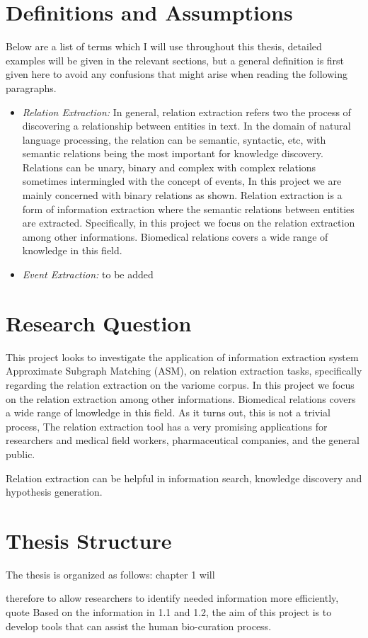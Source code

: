 \section{Definitions and Assumptions}
Below are a list of terms which I will use throughout this thesis, detailed examples will be given in the relevant sections, but a general definition is first given here to avoid any confusions that might arise when reading the following paragraphs.
\begin{itemize}
	\item \emph{Relation Extraction:} In general, relation extraction refers two the process of discovering a relationship between entities in text. In the domain of natural language processing, the relation can be semantic, syntactic, etc, with semantic relations being the most important for knowledge discovery. Relations can be unary, binary and complex with complex relations sometimes intermingled with the concept of events, In this project we are mainly concerned with binary relations as shown. Relation extraction is a form of information extraction where the semantic relations between entities are extracted.
	Specifically, in this project we focus on the relation extraction among other informations. Biomedical relations covers a wide range of knowledge in this field.
	\item \emph{Event Extraction:} to be added
\end{itemize}

\section{Research Question}\label{section1.2}%
This project looks to investigate the application of information extraction system Approximate Subgraph Matching (ASM)\cite{iu2013approximate},  on relation extraction tasks, specifically regarding the relation extraction on the variome corpus.
In this project we focus on the relation extraction among other informations. Biomedical relations covers a wide range of knowledge in this field. As it turns out, this is not a trivial process, The relation extraction tool has a very promising applications for researchers and medical field workers, pharmaceutical companies, and the general public. 

Relation extraction can be helpful in information search, knowledge discovery and hypothesis generation. 

\section{Thesis Structure}\label{section1.3} %
The thesis is organized as follows: chapter 1 will







therefore to allow researchers to identify
needed information more efficiently, quote
Based on the information in 1.1 and 1.2, the aim of this project is to develop tools that can assist the human bio-curation process.


